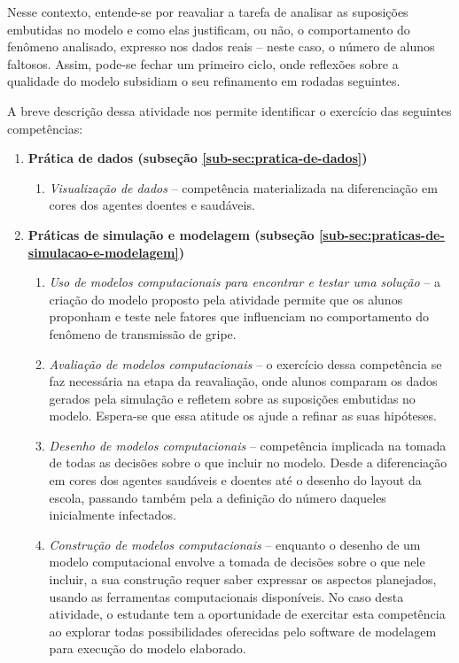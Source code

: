 Nesse contexto, entende-se por reavaliar a tarefa de analisar as suposições embutidas no modelo e como elas justificam, ou não, o comportamento do fenômeno analisado, expresso nos dados reais -- neste caso, o número de alunos faltosos. Assim, pode-se fechar um primeiro ciclo, onde reflexões sobre a qualidade do modelo subsidiam o seu refinamento em rodadas seguintes.

A breve descrição dessa atividade nos permite identificar o exercício das seguintes competências:

\begin{enumerate}
  \item \textbf{Prática de dados (subseção \ref{sub-sec:pratica-de-dados})}
    \begin{enumerate}
      \item \textit{Visualização de dados} -- competência materializada na diferenciação em cores dos agentes doentes e saudáveis.
    \end{enumerate}

  \item \textbf{Práticas de simulação e modelagem (subseção \ref{sub-sec:praticas-de-simulacao-e-modelagem})}
    \begin{enumerate}
      \item \textit{Uso de modelos computacionais para encontrar e testar uma solução} -- a criação do modelo proposto pela atividade permite que os alunos proponham e teste nele fatores que influenciam no comportamento do fenômeno de transmissão de gripe.

      \item \textit{Avaliação de modelos computacionais} -- o exercício dessa competência se faz necessária na etapa da reavaliação, onde alunos comparam os dados gerados pela simulação e refletem sobre as suposições embutidas no modelo. Espera-se que essa atitude os ajude a refinar as suas hipóteses. 
     
      \item \textit{Desenho de modelos computacionais} -- competência implicada na tomada de todas as decisões sobre o que incluir no modelo. Desde a diferenciação em cores dos agentes saudáveis e doentes até o desenho do layout da escola, passando também pela a definição do número daqueles inicialmente infectados.

      \item \textit{Construção de modelos computacionais} -- enquanto o desenho de um modelo computacional envolve a tomada de decisões sobre o que nele incluir, a sua construção requer saber expressar os aspectos planejados, usando as ferramentas computacionais disponíveis. No caso desta atividade, o estudante tem a oportunidade de exercitar esta competência ao explorar todas possibilidades oferecidas pelo software de modelagem para execução do modelo elaborado. 
    \end{enumerate}


\end{enumerate}
